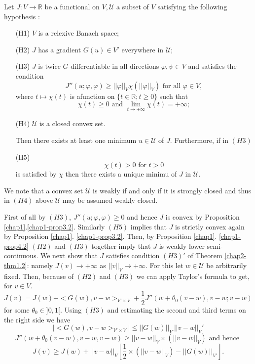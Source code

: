 \begin{theorem}\label{chap2-thm2.1}
Let $J : V \to \mathbb{R}$ be a functional on $V, \mathcal{U}$ a subset of $V$ satisfying the following hypothesis :
\begin{enumerate}
\item[(H1)] $V$ is a relexive Banach space;
\item[(H2)] $J$ has a gradient $G(u) \in V'$ everywhere in $\mathcal{U}$;
\item[(H3)] $J$ is twice $G$-differentiable in all directions $\varphi, \psi \in V$ and satisfies the condition
$$
J''(u; \varphi, \varphi) \geq ||\varphi||_{V} \chi (||\varphi||_{V}) \text{ for all } \varphi \in V,
$$\pageoriginale
where $t \mapsto \chi (t)$ is afunction on $\{t \in \mathbb{R}; t \geq 0\}$ such that
$$
\chi(t) \geq 0 \text{ and } \lim_{t \to + \infty} \chi(t) = +\infty;
$$
\item[(H4)] $\mathcal{U}$ is a closed convex set.

Then there exists at least one minimum $u \in \mathcal{U}$ of $J$. Furthermore, if in $(H3)$
\item[(H5)] 
$$
\chi(t) > 0 \text{ for } t > 0
$$
is satisfied by $\chi$ then there exists a unique minimu of $J$ in $\mathcal{U}$.
\end{enumerate}
\end{theorem}

\begin{remark}\label{chap2-rem2.1}
We note that a convex set $\mathcal{U}$ is weakly if and only if it is strongly closed and thus in $(H4)$ above $\mathcal{U}$ may be assumed weakly closed.
\end{remark}

\medskip
{} First of all by $(H3)$, $J''(u ; \varphi, \varphi) \geq 0$ and hence $J$ is convex by Proposition \ref{chap1}.\ref{chap1-prop3.2}. Similarly $(H5)$ implies that $J$ is strictly convex again by Proposition \ref{chap1}. \ref{chap1-prop3.2}. Then, by Proposition \ref{chap1}. \ref{chap1-prop4.2} $(H2)$ and $(H3)$ together imply that $J$ is weakly lower semi-continuous. We next show that $J$ satisfies condition $(H3)'$ of Theorem \ref{chap2-thm1.2}: namely $J(v) \to + \infty$ as $||v||_{V} \to + \infty$. For this let $w \in \mathcal{U}$ be arbitrarily fixed. Then, because of $(H2)$ and $(H3)$ we can apply Taylor's formula to get, for $v \in V$.
$$
J(v) = J(w) + <G(w), v - w>_{V' \times V} + \frac{1}{2} J''(w+\theta_{0}(v-w), v-w; v-w)
$$
for some $\theta_{0} \in]0,1[$. Using $(H3)$ and estimating the second and third terms on the right side we have
$$
|<G(w), v-w>_{V' \times V} |\leq ||G(w)||_{V'} ||v-w||_{V}'
$$
$$
J''(w+\theta_{0}(v-w), v-w, v-w) \geq ||v-w||_{V} \times (||v-w||_{V}) \text{ and hence }
$$
$$
J(v) \geq J(w) + ||v-w||_{V} [\frac{1}{2} \times (||v-w||_{V}) - ||G(w)||_{V'}].
$$

